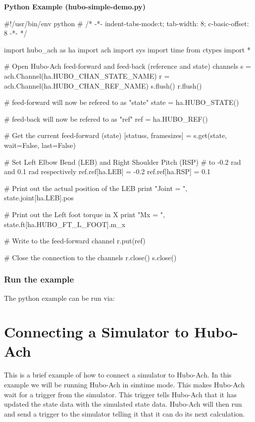 \footnotesize
\noindent \textbf{Python Example (hubo-simple-demo.py)}
\vspace{-6mm}
\begin{code}
#!/usr/bin/env python
# /* -*-  indent-tabs-mode:t; tab-width: 8; c-basic-offset: 8  -*- */

import hubo_ach as ha
import ach
import sys
import time
from ctypes import *

# Open Hubo-Ach feed-forward and feed-back (reference and state) channels
s = ach.Channel(ha.HUBO_CHAN_STATE_NAME)
r = ach.Channel(ha.HUBO_CHAN_REF_NAME)
s.flush()
r.flush()

# feed-forward will now be refered to as "state"
state = ha.HUBO_STATE()

# feed-back will now be refered to as "ref"
ref = ha.HUBO_REF()

# Get the current feed-forward (state) 
[statuss, framesizes] = s.get(state, wait=False, last=False)

# Set Left Elbow Bend (LEB) and Right Shoulder Pitch (RSP) 
# to  -0.2 rad and 0.1 rad respectively
ref.ref[ha.LEB] = -0.2
ref.ref[ha.RSP] = 0.1

# Print out the actual position of the LEB
print "Joint = ", state.joint[ha.LEB].pos

# Print out the Left foot torque in X
print "Mx = ", state.ft[ha.HUBO_FT_L_FOOT].m_x

# Write to the feed-forward channel
r.put(ref)

# Close the connection to the channels
r.close()
s.close()
\end{code}
\normalsize

\subsubsection{Run the example}
The python example can be run via:





\section{Connecting a Simulator to Hubo-Ach}
This is a brief example of how to connect a simulator to Hubo-Ach. In this example we will be running Hubo-Ach in simtime mode. This makes Hubo-Ach wait for a trigger from the simulator. This trigger tells Hubo-Ach that it has updated the state data with the simulated state data. Hubo-Ach will then run and send a trigger to the simulator telling it that it can do its next calculation.

